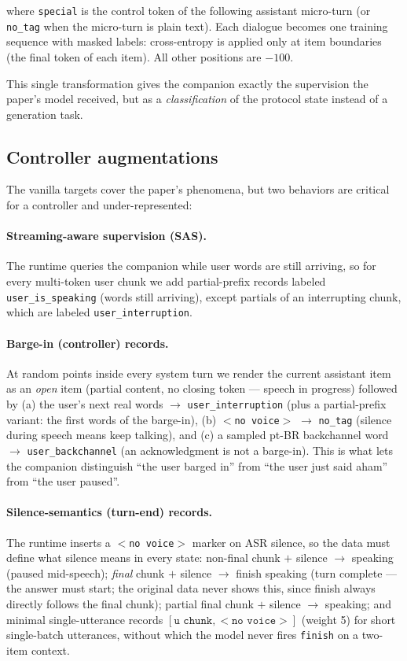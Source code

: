 \documentclass[conference]{IEEEtran}
\begin{document}
where \texttt{special} is the control token of the following assistant
micro-turn (or \texttt{no\_tag} when the micro-turn is plain text). Each
dialogue becomes one training sequence with masked labels: cross-entropy is
applied only at item boundaries (the final token of each item). All other
positions are $-100$.

This single transformation gives the companion exactly the supervision the
paper's model received, but as a \emph{classification} of the protocol
state instead of a generation task.

\subsection{Controller augmentations}
The vanilla targets cover the paper's phenomena, but two behaviors are
critical for a controller and under-represented:

\paragraph{Streaming-aware supervision (SAS).} The runtime queries the
companion while user words are still arriving, so for every multi-token
user chunk we add partial-prefix records labeled \texttt{user\_is\_speaking}
(words still arriving), except partials of an interrupting chunk, which are
labeled \texttt{user\_interruption}.

\paragraph{Barge-in (controller) records.} At random points inside every
system turn we render the current assistant item as an \emph{open} item
(partial content, no closing token — speech in progress) followed by
(a) the user's next real words $\rightarrow$ \texttt{user\_interruption}
(plus a partial-prefix variant: the first words of the barge-in),
(b) \texttt{$<$no voice$>$} $\rightarrow$ \texttt{no\_tag} (silence during
speech means keep talking), and (c) a sampled pt-BR backchannel word
$\rightarrow$ \texttt{user\_backchannel} (an acknowledgment is not a
barge-in). This is what lets the companion distinguish ``the user barged
in'' from ``the user just said aham'' from ``the user paused''.

\paragraph{Silence-semantics (turn-end) records.} The runtime inserts a
\texttt{$<$no voice$>$} marker on ASR silence, so the data must define what
silence means in every state: non-final chunk $+$ silence $\rightarrow$
speaking (paused mid-speech); \emph{final} chunk $+$ silence $\rightarrow$
finish speaking (turn complete — the answer must start; the original data
never shows this, since finish always directly follows the final chunk);
partial final chunk $+$ silence $\rightarrow$ speaking; and minimal
single-utterance records $[\texttt{u chunk}, \texttt{$<$no voice$>$}]$
(weight 5) for short single-batch utterances, without which the model never
fires \texttt{finish} on a two-item context.
\end{document}
